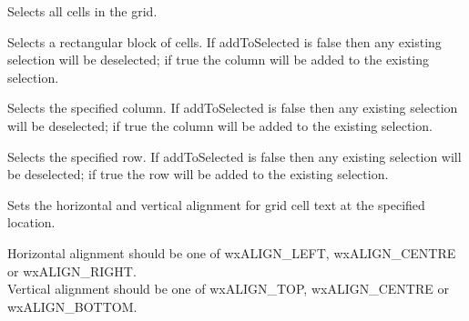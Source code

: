 \label{wxgridselectall}


Selects all cells in the grid.

\label{wxgridselectblock}



Selects a rectangular block of cells. If addToSelected is false then any existing selection will be
deselected; if true the column will be added to the existing selection. 

\label{wxgridselectcol}


Selects the specified column. If addToSelected is false then any existing selection will be
deselected; if true the column will be added to the existing selection.

\label{wxgridselectrow}


Selects the specified row. If addToSelected is false then any existing selection will be
deselected; if true the row will be added to the existing selection.

\label{wxgridsetcellalignment}




Sets the horizontal and vertical alignment for grid cell text at the specified location.

Horizontal alignment should be one of wxALIGN\_LEFT, wxALIGN\_CENTRE or wxALIGN\_RIGHT. \\
Vertical alignment should be one of wxALIGN\_TOP, wxALIGN\_CENTRE or wxALIGN\_BOTTOM.

